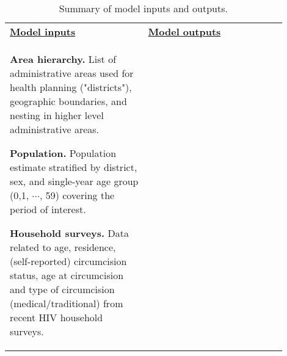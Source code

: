\documentclass{article}
\begin{document}
\begin{appendix}
{\linespread{1} 
\begin{table}[H]
	\small
	\centering	
	\caption{Summary of model inputs and outputs.}
    \label{tab::inputsoutputs}
	\begin{tabular}{| p{0.45\linewidth} | p{0.45\linewidth} |}
		\hline

			\textbf{\underline{Model inputs}} & \textbf{\underline{Model outputs}} \\
			
			{\bf Area hierarchy.} List of administrative areas used for health planning ("districts"), geographic boundaries, and nesting in higher level administrative areas.
			\vspace{5pt}
			
			{\bf Population.} Population estimate stratified by district, sex, and single-year age group (0,1, $\cdots$, 59) covering the period of interest. 
			\vspace{5pt}
			
			{\bf Household surveys.} Data related to age, residence, (self-reported) circumcision status, age at circumcision and type of circumcision (medical/traditional) from recent HIV household surveys. 
			

\end{tabular}
\end{table}}
\end{appendix}
\end{document}

